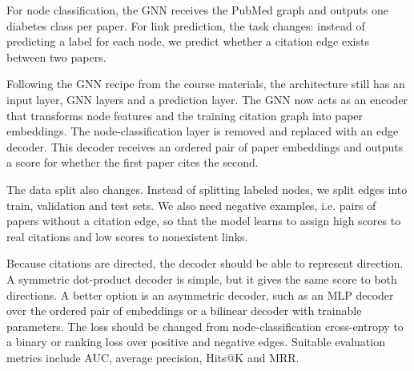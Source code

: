 \documentclass[11pt]{article}
\begin{document}
For node classification, the GNN receives the PubMed graph and outputs one diabetes class per paper. For link prediction, the task changes: instead of predicting a label for each node, we predict whether a citation edge exists between two papers.

Following the GNN recipe from the course materials, the architecture still has an input layer, GNN layers and a prediction layer. The GNN now acts as an encoder that transforms node features and the training citation graph into paper embeddings. The node-classification layer is removed and replaced with an edge decoder. This decoder receives an ordered pair of paper embeddings and outputs a score for whether the first paper cites the second.

The data split also changes. Instead of splitting labeled nodes, we split edges into train, validation and test sets. We also need negative examples, i.e. pairs of papers without a citation edge, so that the model learns to assign high scores to real citations and low scores to nonexistent links.

Because citations are directed, the decoder should be able to represent direction. A symmetric dot-product decoder is simple, but it gives the same score to both directions. A better option is an asymmetric decoder, such as an MLP decoder over the ordered pair of embeddings or a bilinear decoder with trainable parameters. The loss should be changed from node-classification cross-entropy to a binary or ranking loss over positive and negative edges. Suitable evaluation metrics include AUC, average precision, Hits@K and MRR.




\end{document}
